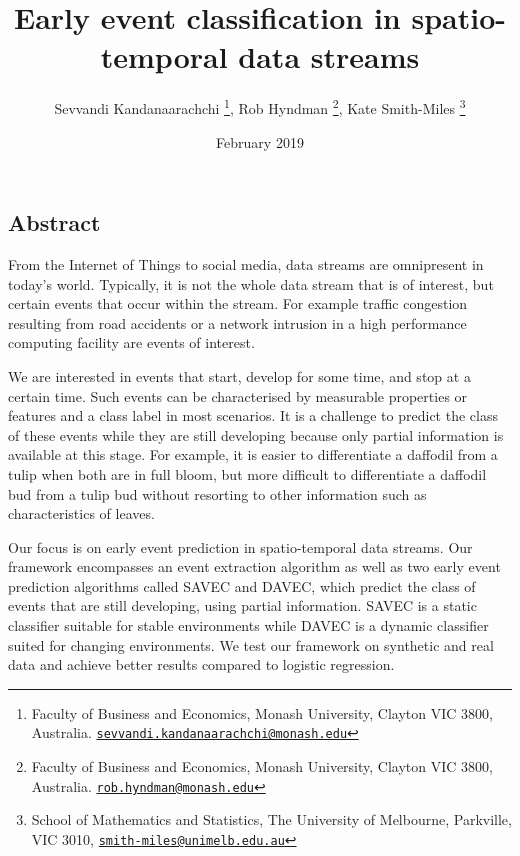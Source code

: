 \documentclass{article}
\def\email#1{\href{mailto:#1}{\nolinkurl{#1}}}
\begin{document}
\title{Early event classification in spatio-temporal data streams }
\author{Sevvandi Kandanaarachchi \thanks{Faculty of Business and Economics, Monash University, Clayton VIC 3800, Australia. \email{sevvandi.kandanaarachchi@monash.edu}}, Rob Hyndman \thanks{Faculty of Business and Economics, Monash University, Clayton VIC 3800, Australia. \email{rob.hyndman@monash.edu}}, Kate Smith-Miles \thanks{School of Mathematics and Statistics, The University of Melbourne, Parkville, VIC 3010, \email{smith-miles@unimelb.edu.au}} }
\date{February 2019}
\maketitle
\begin{centering}
\section*{Abstract}
\end{centering}

From the Internet of Things to social media, data streams are omnipresent in today's world. Typically, it is not the whole data stream that is of interest, but certain events that occur within the stream. For example traffic congestion resulting from road accidents or a network intrusion in a high performance computing facility are events of interest.

We are interested in events that start, develop for some time, and stop at a certain time. Such events can be characterised by measurable properties or features and a class label in most scenarios. It is a challenge to predict the class of these events while they are still developing because only partial information is available at this stage. For example, it is easier to differentiate a daffodil from a tulip when both are in full bloom, but more difficult to differentiate a daffodil bud from a tulip bud without resorting to other information such as characteristics of leaves.

Our focus is on early event prediction in spatio-temporal data streams. Our framework encompasses an event extraction algorithm as well as two early event prediction algorithms called SAVEC and DAVEC, which predict the class of events that are still developing, using partial information. SAVEC is a static classifier suitable for stable environments while DAVEC is a dynamic classifier suited for changing environments. We test our framework on synthetic and real data and achieve better results compared to logistic regression.
\end{document}
